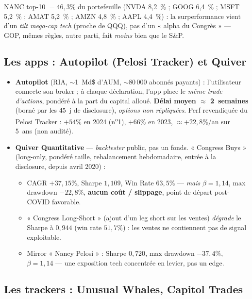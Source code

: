 \documentclass[11pt,a4paper]{article}
\begin{document}
NANC top-10 $= 46{,}3\%$ du portefeuille (NVDA 8,2~\% ; GOOG 6,4~\% ; MSFT 5,2~\% ; AMAT 5,2~\% ; AMZN 4,8~\% ;
AAPL 4,4~\%) : la surperformance vient d'un \emph{tilt mega-cap tech} (proche de QQQ), pas d'un « alpha du
Congrès » --- GOP, mêmes règles, autre parti, fait \emph{moins} bien que le S\&P.

\subsection{Les apps : Autopilot (Pelosi Tracker) et Quiver}

\begin{itemize}
  \item \textbf{Autopilot} (RIA, $\sim$1~Md\$ d'AUM, $\sim$80\,000 abonnés payants) : l'utilisateur connecte
  son broker ; à chaque déclaration, l'app place le \emph{même trade d'actions}, pondéré à la part du capital
  alloué. \textbf{Délai moyen $\approx$ 2~semaines} (borné par les 45~j de disclosure), \emph{options non
  répliquées}. Perf revendiquée du Pelosi Tracker : $+54\%$ en 2024 (n\textsuperscript{o}1), $+66\%$ en 2023,
  $\approx +22{,}8\%$/an sur 5~ans (non audité).
  \item \textbf{Quiver Quantitative} --- \emph{backtester} public, pas un fonds. « Congress Buys » (long-only,
  pondéré taille, rebalancement hebdomadaire, entrée à la disclosure, depuis avril 2020) :
  \begin{itemize}
    \item CAGR $+37{,}15\%$, Sharpe $1{,}109$, Win Rate $63{,}5\%$ --- \emph{mais} $\beta = 1{,}14$,
    max drawdown $-22{,}8\%$, \textbf{aucun coût / slippage}, point de départ post-COVID favorable.
    \item « Congress Long-Short » (ajout d'un leg short sur les ventes) \emph{dégrade} le Sharpe à $0{,}944$
    (win rate $51{,}7\%$) : les ventes ne contiennent pas de signal exploitable.
    \item Mirror « Nancy Pelosi » : Sharpe $0{,}720$, max drawdown $-37{,}4\%$, $\beta = 1{,}14$ --- une
    exposition tech concentrée en levier, pas un edge.
  \end{itemize}
\end{itemize}

\subsection{Les trackers : Unusual Whales, Capitol Trades}
\end{document}
